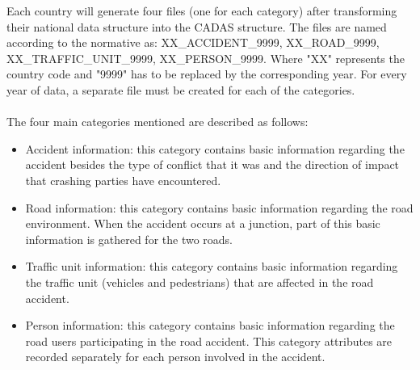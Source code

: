 Each country will generate four files (one for each category) after transforming their national data structure into the \ac{CADAS} structure. The files are named according to the normative as: XX\_ACCIDENT\_9999, XX\_ROAD\_9999, XX\_TRAFFIC\_UNIT\_9999, XX\_PERSON\_9999. Where "XX" represents the country code and "9999" has to be replaced by the corresponding year. For every year of data, a separate file must be created for each of the categories. 
\\
\\
The four main categories mentioned are described as follows: 
\begin{itemize}
    \item Accident information: this category contains basic information regarding the accident besides the type of conflict that it was and the direction of impact that crashing parties have encountered. 
    \item Road information: this category contains basic information regarding the road environment. When the accident occurs at a junction, part of this basic information is gathered for the two roads.
    \item Traffic unit information: this category contains basic information regarding the traffic unit (vehicles and pedestrians) that are affected in the road accident. 
    \item Person information: this category contains basic information regarding the road users participating in the road accident. This category attributes are recorded separately for each person involved in the accident.
\end{itemize}

